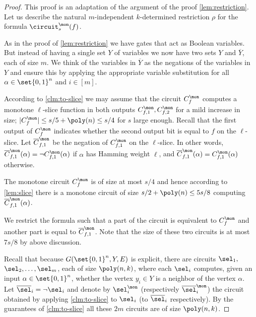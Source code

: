\begin{proof}
  This proof is an adaptation of the argument of the proof
  \cref{lem:restriction}. Let us describe the natural $m$-independent
  $k$-determined restriction $\rho$ for the formula
  $\circuit_s^\mon(f)$.
  
  As in the proof of \cref{lem:restriction} we have gates that act as
  Boolean variables. But instead of having a single set $Y$ of
  variables we now have two sets $Y$ and $\overline Y$, each of size
  $m$. We think of the variables in $\overline Y$ as the negations of
  the variables in $Y$ and ensure this by applying the appropriate
  variable substitution for all $\alpha \in \set{0,1}^n$ and $i \in [m]$.

  According to \cref{clm:to-slice} we may assume that the circuit
  $C_f^\mon$ computes a monotone $\ell$-slice function in both outputs
  $C_{f,1}^\mon, C_{f,2}^\mon$ for a mild increase in size;
  $|C_f^\mon| \le s/5 + \poly(n) \le s/4$ for $s$ large enough. Recall
  that the first output of $C_f^\mon$ indicates whether the second
  output bit is equal to $f$ on the $\ell$-slice. Let
  $\overline C^\mon_{f,1}$ be the negation of $C_{f,1}^\mon$ on the
  $\ell$-slice. In other words,
  $\overline C^\mon_{f,1}(\alpha) = \lnot C_{f,1}^\mon(\alpha)$ if
  $\alpha$ has Hamming weight $\ell$, and
  $\overline C^\mon_{f,1}(\alpha) = C_{f,1}^\mon(\alpha)$ otherwise.

  The monotone circuit $C_f^\mon$ is of size at most $s/4$ and hence
  according to \cref{lem:slice} there is a monotone circuit of size
  $s/2 + \poly(n) \le 5s/8$ computing
  $\overline C^\mon_{f,1}(\alpha)$.

  We restrict the formula such that a part of the circuit is
  equivalent to $C_f^\mon$ and another part is equal to
  $\overline C^\mon_{f,1}$. Note that the size of these two circuits
  is at most $7s/8$ by above discussion.

  Recall that because $G(\set{0,1}^n, Y, E)$ is explicit, there are
  circuits $\sel_1,$ $\sel_2, \ldots, \sel_m$, each of size $\poly(n,k)$, where
  each $\sel_i$ computes, given an input $\alpha \in \set{0,1}^n$,
  whether the vertex $y_i \in Y$ is a neighbor of the vertex $\alpha$.
  Let $\overline \sel_i = \lnot \sel_i$ and denote by $\sel_i^\mon$
  (respectively $\overline \sel_i^\mon$) the circuit obtained by
  applying \cref{clm:to-slice} to $\sel_i$ (to $\overline \sel_i$
  respectively). By the guarantees of \cref{clm:to-slice} all these
  $2m$ circuits are of size $\poly(n,k)$.


\end{proof}
